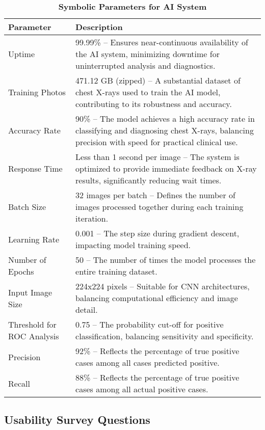 \documentclass[12pt, titlepage]{article}
\begin{document}
\begin{table}[H]
  \centering
  \noindent
  \begin{tabular}{|p{3.5cm}|p{9.5cm}|}
      \hline
      \rowcolor{lightgray} \textbf{Parameter} & \textbf{Description} \\
      \hline
      Uptime & 99.99\% – Ensures near-continuous availability of the AI system, minimizing downtime for uninterrupted analysis and diagnostics. \\
      \hline
      Training Photos & 471.12 GB (zipped) – A substantial dataset of chest X-rays used to train the AI model, contributing to its robustness and accuracy. \\
      \hline
      Accuracy Rate & 90\% – The model achieves a high accuracy rate in classifying and diagnosing chest X-rays, balancing precision with speed for practical clinical use. \\
      \hline
      Response Time & Less than 1 second per image – The system is optimized to provide immediate feedback on X-ray results, significantly reducing wait times. \\
      \hline
      Batch Size & 32 images per batch – Defines the number of images processed together during each training iteration. \\
      \hline
      Learning Rate & 0.001 – The step size during gradient descent, impacting model training speed. \\
      \hline
      Number of Epochs & 50 – The number of times the model processes the entire training dataset. \\
      \hline
      Input Image Size & 224x224 pixels – Suitable for CNN architectures, balancing computational efficiency and image detail. \\
      \hline
      Threshold for ROC Analysis & 0.75 – The probability cut-off for positive classification, balancing sensitivity and specificity. \\
      \hline
      Precision & 92\% – Reflects the percentage of true positive cases among all cases predicted positive. \\
      \hline
      Recall & 88\% – Reflects the percentage of true positive cases among all actual positive cases. \\
      \hline
  \end{tabular}
  \caption{\textbf{Symbolic Parameters for AI System}}
\end{table}


\subsection{Usability Survey Questions}
\end{document}
